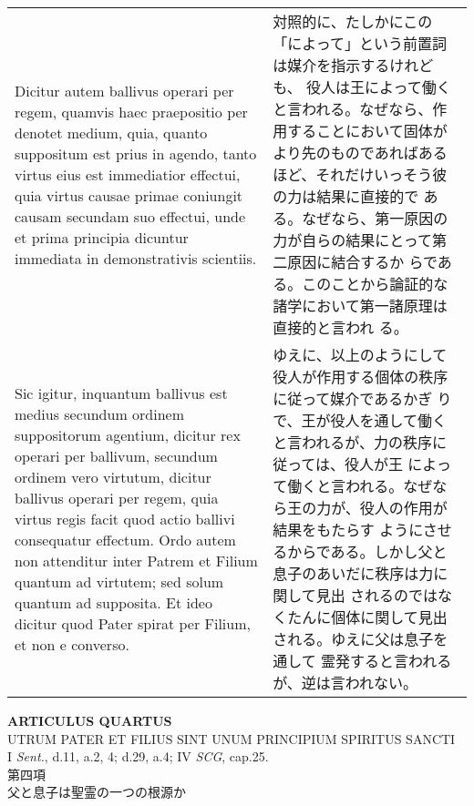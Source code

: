 \documentclass[10pt]{jsarticle} %
\begin{document}
\begin{longtable}{p{21em}p{21em}}
\\

Dicitur autem ballivus operari per regem, quamvis haec
praepositio per denotet medium, quia, quanto suppositum est prius in
agendo, tanto virtus eius est immediatior effectui, quia virtus causae
primae coniungit causam secundam suo effectui, unde et prima principia
dicuntur immediata in demonstrativis scientiis. 

&

対照的に、たしかにこの「によって」という前置詞は媒介を指示するけれども、
 役人は王によって働くと言われる。なぜなら、作用することにおいて固体が
 より先のものであればあるほど、それだけいっそう彼の力は結果に直接的で
 ある。なぜなら、第一原因の力が自らの結果にとって第二原因に結合するか
 らである。このことから論証的な諸学において第一諸原理は直接的と言われ
 る。

\\

Sic igitur, inquantum
ballivus est medius secundum ordinem suppositorum agentium, dicitur
rex operari per ballivum, secundum ordinem vero virtutum, dicitur
ballivus operari per regem, quia virtus regis facit quod actio ballivi
consequatur effectum. Ordo autem non attenditur inter Patrem et Filium
quantum ad virtutem; sed solum quantum ad supposita. Et ideo dicitur
quod Pater spirat per Filium, et non e converso.

&

ゆえに、以上のようにして役人が作用する個体の秩序に従って媒介であるかぎ
 りで、王が役人を通して働くと言われるが、力の秩序に従っては、役人が王
 によって働くと言われる。なぜなら王の力が、役人の作用が結果をもたらす
 ようにさせるからである。しかし父と息子のあいだに秩序は力に関して見出
 されるのではなくたんに個体に関して見出される。ゆえに父は息子を通して
 霊発すると言われるが、逆は言われない。

\\


\end{longtable}
\newpage

\begin{center}
{\Large {\bf ARTICULUS QUARTUS}}\\
{\large UTRUM PATER ET FILIUS SINT UNUM PRINCIPIUM SPIRITUS SANCTI}\\
{\footnotesize I {\itshape Sent.}, d.11, a.2, 4; d.29, a.4; IV
 {\itshape SCG}, cap.25.}\\
{\Large 第四項\\父と息子は聖霊の一つの根源か}
\end{center}
\end{document}
